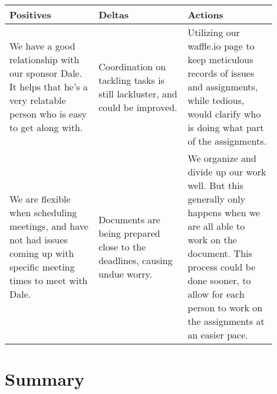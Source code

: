 \documentclass[draftclsnofoot,onecolumn,letterpaper,10pt]{IEEEtran}
\begin{document}
\begin{center}
	\begin{tabular}{p{0.3\linewidth} p{0.3\linewidth} p{0.3\linewidth}}
		\toprule
		\textbf{Positives} & \textbf{Deltas} & \textbf{Actions} \\
		\midrule
		We have a good relationship with our sponsor Dale. It helps that he's a very relatable person who is easy to get along with. & Coordination on tackling tasks is still lackluster, and could be improved. & Utilizing our waffle.io page to keep meticulous records of issues and assignments, while tedious, would clarify who is doing what part of the assignments.\\
		We are flexible when scheduling meetings, and have not had issues coming up with specific meeting times to meet with Dale.& Documents are being prepared close to the deadlines, causing undue worry.& We organize and divide up our work well. But this generally only happens when we are all able to work on the document. This process could be done sooner, to allow for each person to work on the assignments at an easier pace.\\

		\bottomrule
	\end{tabular}
\end{center}


%
%

\section{Summary}
\end{document}
